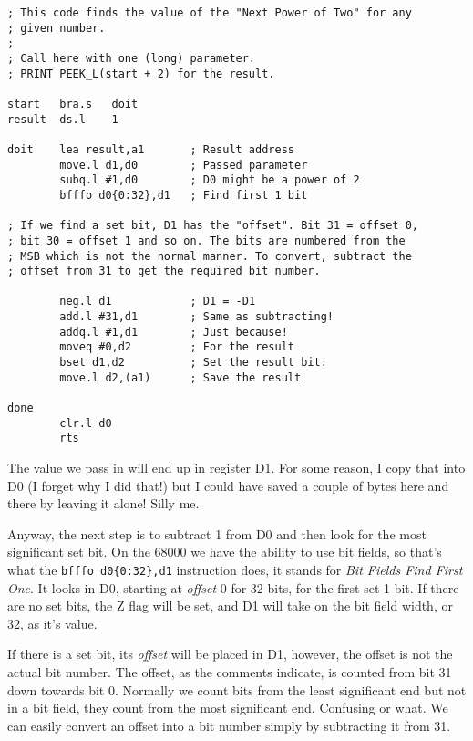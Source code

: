 \begin{lstlisting}[caption={MC60000 - Power2\_asm},label={lis:MC60000-Power2},breaklines=true,showstringspaces=false,tabsize=4]
; This code finds the value of the "Next Power of Two" for any
; given number. 
;
; Call here with one (long) parameter.
; PRINT PEEK_L(start + 2) for the result.

start   bra.s   doit
result  ds.l    1

doit    lea result,a1       ; Result address
        move.l d1,d0        ; Passed parameter
        subq.l #1,d0        ; D0 might be a power of 2
        bfffo d0{0:32},d1   ; Find first 1 bit

; If we find a set bit, D1 has the "offset". Bit 31 = offset 0,
; bit 30 = offset 1 and so on. The bits are numbered from the
; MSB which is not the normal manner. To convert, subtract the
; offset from 31 to get the required bit number.

        neg.l d1            ; D1 = -D1
        add.l #31,d1        ; Same as subtracting!
        addq.l #1,d1        ; Just because!
        moveq #0,d2         ; For the result
        bset d1,d2          ; Set the result bit.
        move.l d2,(a1)      ; Save the result

done
        clr.l d0
        rts
\end{lstlisting}

The value we pass in will end up in register D1. For some reason,
I copy that into D0 (I forget why I did that!) but I could have saved
a couple of bytes here and there by leaving it alone! Silly me.

Anyway, the next step is to subtract 1 from D0 and then look for the
most significant set bit. On the 68000 we have the ability to use
bit fields, so that's what the \lstinline[showstringspaces=false,tabsize=4]!bfffo d0{0:32},d1!
instruction does, it stands for \emph{Bit Fields Find First One}.
It looks in D0, starting at \emph{offset} 0 for 32 bits, for the first
set 1 bit. If there are no set bits, the Z flag will be set, and D1
will take on the bit field width, or 32, as it's value. 

If there is a set bit, its \emph{offset} will be placed in D1, however,
the offset is not the actual bit number. The offset, as the comments
indicate, is counted from bit 31 down towards bit 0. Normally we count
bits from the least significant end but not in a bit field, they count
from the most significant end. Confusing or what. We can easily convert
an offset into a bit number simply by subtracting it from 31.

